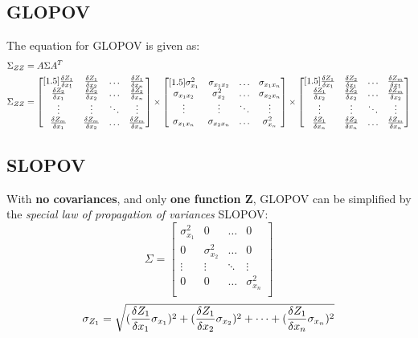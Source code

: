 \subsection{GLOPOV}
The equation for GLOPOV is given as:
\begin{align*}
\Sigma_{ZZ} &= 
A\Sigma A^T \\
\Sigma_{ZZ} &= 
\begin{bmatrix}[1.5]
\frac{\delta Z_1}{\delta x_1} & \frac{\delta Z_1}{\delta x_2} & \hdots & \frac{\delta Z_1}{\delta x_n} \\
\frac{\delta Z_2}{\delta x_1} & \frac{\delta Z_2}{\delta x_2} & \hdots & \frac{\delta Z_2}{\delta x_n} \\
\vdots & \vdots & \ddots & \vdots \\
\frac{\delta Z_m}{\delta x_1} & \frac{\delta Z_m}{\delta x_2} & \hdots & \frac{\delta Z_m}{\delta x_n} \\
\end{bmatrix}
\times
\begin{bmatrix}[1.5]
\sigma^2_{x_{1}} & \sigma_{x_{1}x_{2}} & \hdots & \sigma_{x_{1}x_{n}} \\
\sigma_{x_{1}x_{2}} & \sigma^2_{x_{2}} & \hdots & \sigma_{x_{2}x_{n}} \\
\vdots & \vdots & \ddots & \vdots \\
\sigma_{x_{1}x_{n}} & \sigma_{x_{2}x_{n}} & \hdots & \sigma^2_{x_{n}} \\
\end{bmatrix}
\times
\begin{bmatrix}[1.5]
\frac{\delta Z_1}{\delta x_1} & \frac{\delta Z_2}{\delta x_1} & \hdots & \frac{\delta Z_m}{\delta x_1} \\
\frac{\delta Z_1}{\delta x_2} & \frac{\delta Z_2}{\delta x_2} & \hdots & \frac{\delta Z_m}{\delta x_2} \\
\vdots & \vdots & \ddots & \vdots \\
\frac{\delta Z_1}{\delta x_n} & \frac{\delta Z_2}{\delta x_n} & \hdots & \frac{\delta Z_m}{\delta x_n} \\
\end{bmatrix}
\end{align*}

\subsection{SLOPOV}
With \textbf{no covariances}, and only \textbf{one function Z}, GLOPOV can be simplified by the \textit{special law of propagation of variances} SLOPOV:
\[
\Sigma = 
\begin{bmatrix}
\sigma^2_{x_{1}} & 0 & \hdots & 0 \\
0 & \sigma^2_{x_{2}} & \hdots & 0 \\
\vdots & \vdots & \ddots & \vdots \\
0 & 0 & \hdots & \sigma^2_{x_{n}} \\
\end{bmatrix}
\]
\[
\sigma_{Z_1} = \sqrt{(\frac{\delta Z_1}{\delta x_1} \sigma_{x_1})^2+(\frac{\delta Z_1}{\delta x_2} \sigma_{x_2})^2+\dots+(\frac{\delta Z_1}{\delta x_n} \sigma_{x_n})^2}
\]
\clearpage

